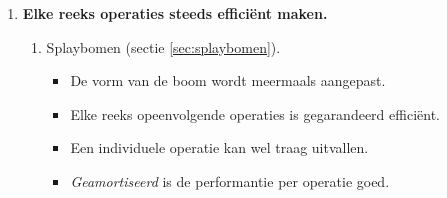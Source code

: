 \begin{itemize}
\begin{enumerate}
\begin{enumerate}
\begin{itemize}
            \end{itemize}
            \item 2-3-bomen (figuur \ref{fig:2-3-tree}).
            \begin{figure}[ht]
                \centering
                \texttt{[image: 2-3-tree]}
                \caption{Een 2-3-boom.}
                \label{fig:2-3-tree}
            \end{figure}
            \begin{itemize}
                \item Elke knoop heeft 2 of 3 kinderen en dus 1 of 2 sleutels.
                \item Elk blad heeft dezelfde diepte.
                \item Bij toevoegen of verwijderen wordt het ideale evenwicht behouden door het aantal kinderen van de knopen te manipuleren.
            \end{itemize}
            \item 2-3-4-bomen.
            \begin{itemize}
                \item Analoog aan een 2-3-boom, maar elke knoop heeft 2, 3 of 4 kinderen.
            \end{itemize}
            \item Rood-zwarte bomen (sectie \ref{sec:rood-zwarte bomen}).
        \end{enumerate}

        \item \textbf{Elke reeks operaties steeds efficiënt maken.}
        \begin{enumerate}
            \item Splaybomen (sectie \ref{sec:splaybomen}).
            \begin{itemize}
                \item De vorm van de boom wordt meermaals aangepast.
                \item Elke reeks opeenvolgende operaties is gegarandeerd efficiënt.
                \item Een individuele operatie kan wel traag uitvallen.
                \item \textit{Geamortiseerd} is de performantie per operatie goed.
            \end{itemize}
        \end{enumerate}


\end{enumerate}
\end{itemize}
